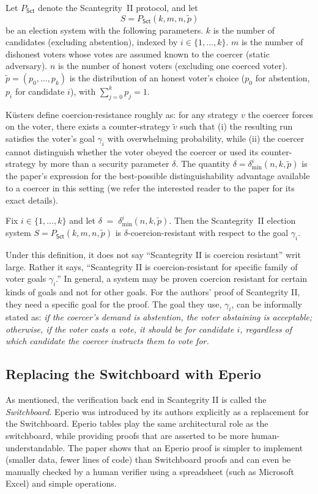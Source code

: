 Let $P_{\mathsf{Sct}}$ denote the Scantegrity~II protocol, and let
\[
S = P_{\mathsf{Sct}}(k,m,n,\tilde p)
\]
be an election system with the following parameters. $k$ is the number of candidates (excluding abstention), indexed by $i\in\{1,\dots,k\}$. $m$ is the number of dishonest voters whose votes are assumed known to the coercer (static adversary). $n$ is the number of honest voters (excluding one coerced voter). $\tilde p=(p_0,\dots,p_k)$ is the distribution of an honest voter's choice ($p_0$ for abstention, $p_i$ for candidate $i$), with $\sum_{j=0}^k p_j=1$.


K{\"u}sters \etal define coercion-resistance roughly as: for any strategy $v$ the coercer forces on the voter, there exists a counter-strategy $\tilde v$ such that (i) the resulting run satisfies the voter's goal $\gamma_i$ with overwhelming probability, while (ii) the coercer cannot distinguish whether the voter obeyed the coercer or used its counter-strategy by more than a security parameter $\delta$. The quantity $\delta=\delta^i_{\min}(n,k,\tilde p)$ is the paper's expression for the best-possible distinguishability advantage available to a coercer in this setting (we refer the interested reader to the paper for its exact details).

\begin{theorem}
Fix $i\in\{1,\dots,k\}$ and let $\delta \;=\; \delta^i_{\min}(n,k,\tilde p).$ Then the Scantegrity~II election system $S=P_{\mathsf{Sct}}(k,m,n,\tilde p)$ is
$\delta$-coercion-resistant with respect to the goal $\gamma_i$.
\end{theorem}


Under this definition, it does not say ``Scantegrity II is coercion resistant'' writ large. Rather it says, ``Scantegrity II is coercion-resistant for specific family of voter goals $\gamma_i$.'' In general, a system may be proven coercion resistant for certain kinds of goals and not for other goals. For the authors' proof of Scantegrity II, they need a specific goal for the proof. The goal they use, $\gamma_i$, can be informally stated as: \textit{if the coercer’s demand is abstention, the voter abstaining is acceptable; otherwise, if the voter casts a vote, it should be for candidate $i$, regardless of which candidate the coercer instructs them to vote for.}


\subsection{Replacing the Switchboard with Eperio}
\label{sec:eperio-coercion}
As mentioned, the verification back end in Scantegrity II is called the {\em Switchboard}. Eperio was introduced by its authors explicitly as a replacement for the Switchboard. Eperio tables play the same architectural role as the switchboard, while providing proofs that are asserted to be more human-understandable. The paper shows that an Eperio proof is simpler to implement (smaller data, fewer lines of code) than Switchboard proofs and can even be manually checked by a human verifier using a spreadsheet (such as Microsoft Excel) and simple operations.

